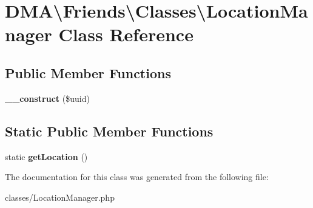 \hypertarget{classDMA_1_1Friends_1_1Classes_1_1LocationManager}{\section{D\+M\+A\textbackslash{}Friends\textbackslash{}Classes\textbackslash{}Location\+Manager Class Reference}
\label{classDMA_1_1Friends_1_1Classes_1_1LocationManager}
}
\subsection*{Public Member Functions}
\begin{DoxyCompactItemize}
\item 
\hypertarget{classDMA_1_1Friends_1_1Classes_1_1LocationManager_a96c818348ca79a9bdcfb61f522f18adc}{{\bfseries \+\_\+\+\_\+construct} (\$uuid)}\label{classDMA_1_1Friends_1_1Classes_1_1LocationManager_a96c818348ca79a9bdcfb61f522f18adc}

\end{DoxyCompactItemize}
\subsection*{Static Public Member Functions}
\begin{DoxyCompactItemize}
\item 
\hypertarget{classDMA_1_1Friends_1_1Classes_1_1LocationManager_a891ca42df61c88580aae3447d15e4bd7}{static {\bfseries get\+Location} ()}\label{classDMA_1_1Friends_1_1Classes_1_1LocationManager_a891ca42df61c88580aae3447d15e4bd7}

\end{DoxyCompactItemize}


The documentation for this class was generated from the following file\+:\begin{DoxyCompactItemize}
\item 
classes/Location\+Manager.\+php\end{DoxyCompactItemize}
